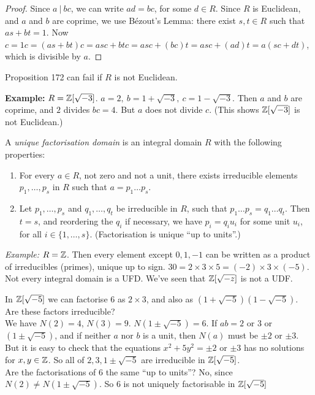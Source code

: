  \begin{proof}
 Since $a ~|~ bc$, we can write $ad = bc$, for some $d \in R$. Since $R$ is Euclidean, and $a$ and $b$ are coprime, we use B\'{e}zout's Lemma: there exist $s,t \in R$ such that $as + bt = 1$. Now $c = 1c = (as + bt)c = asc + btc = asc + (bc)t = asc + (ad)t = a(sc + dt)$, which is divisible by $a$. 
 \end{proof}\vspace*{5pt}
 
 Proposition 172 can fail if $R$ is not Euclidean.
 
 \textbf{Example:} $R = \mathbb{Z}[\sqrt{-3}]$. $a = 2, ~b = 1 + \sqrt{-3},~ c = 1-\sqrt{-3}$. Then $a$ and $b$ are coprime, and $2$ divides $bc = 4$. But $a$ does not divide $c$. (This shows $\mathbb{Z}[\sqrt{-3}]$ is not Euclidean.)\\
 
 \begin{definition} A \emph{unique factorisation domain} is an integral domain $R$ with the following properties:\begin{enumerate}
\item For every $a \in R$, not zero and not a unit, there exists irreducible elements $p_1,\dots,p_s$ in $R$ such that $a = p_1\dots p_s$.
\item Let $p_1,\dots,p_s$ and $q_1,\dots,q_t$ be irreducible in $R$, such that $p_1\dots p_s = q_1\dots q_t$. Then $t = s$, and reordering the $q_i$ if necessary, we have $p_i = q_iu_i$ for some unit $u_i$, for all $i \in \{1,\dots,s\}$. (Factorisation is unique ``up to units''.)
\end{enumerate} \end{definition}

\textit{Example:} $R = \mathbb{Z}$. Then every element except $0,1,-1$ can be written as a product of irreducibles (primes), unique up to sign. $30 = 2\times 3 \times 5 = (-2) \times 3 \times (-5)$.\\

  
 Not   
 every integral domain is a UFD. We've seen that $\mathbb{Z}[\sqrt{-z}]$ is not a UDF.\\
  
\begin{example} In $\mathbb{Z}[\sqrt{-5}]$ we can factorise $6$ as $2\times 3$, and also as $(1 + \sqrt{-5})(1-\sqrt{-5})$. Are these factors irreducible?\vspace*{5pt}\\ We have $N(2) = 4$, $N(3) = 9$. $N(1 \pm \sqrt{-5}) = 6$. If $ab = 2$ or $3$ or $(1 \pm \sqrt{-5})$, and if neither $a$ nor $b$ is a unit, then $N(a)$ must be $\pm 2$ or $\pm 3$. But it is easy to check that the equations $x^2 + 5y^2 = \pm 2$ or $\pm 3$ has no solutions for $x,y \in \mathbb{Z}$. So all of $2,3,1\pm \sqrt{-5}$ are irreducible in $\mathbb{Z}[\sqrt{-5}]$. \vspace*{5pt}\\ Are the factorisations of $6$ the same ``up to units''? No, since $N(2) \neq N(1 \pm \sqrt{-5})$. So $6$ is not uniquely factorisable in $\mathbb{Z}[\sqrt{-5}]$
	
\end{example}


